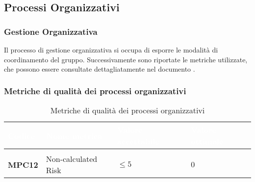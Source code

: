 \subsection{Processi Organizzativi}
\subsubsection{Gestione Organizzativa}
Il processo di gestione organizzativa si occupa di esporre le modalità di coordinamento del gruppo. Successivamente sono riportate le metriche utilizzate, che possono essere consultate dettagliatamente nel documento .

\subsubsection{Metriche di qualità dei processi organizzativi}
{
\renewcommand{\arraystretch}{1.5}
\centering
\begin{longtable}{C{2.5cm} C{5.5cm} C{3.5cm} C{3.5cm}}
\textcolor{white}{\textbf{Codice}}&
\textcolor{white}{\textbf{Nome metrica}}&
\textcolor{white}{\textbf{Valore accettabile}}&
\textcolor{white}{\textbf{Valore ottimale}}\\	
\hline
{}
 \\	
\endhead
\endfoot
{}\caption{Metriche di qualità dei processi organizzativi}
\endlastfoot

\textbf{MPC12} & Non-calculated Risk & $ \leq 5 $ & $ 0 $ \\
\end{longtable}
}